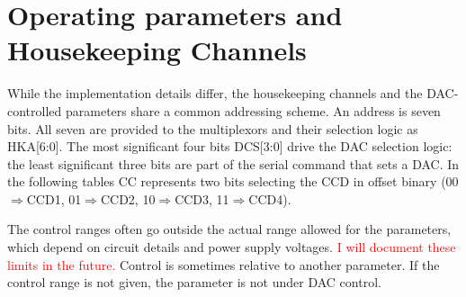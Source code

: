 \documentclass[12pt]{article}
\let\oldsection\section
\renewcommand{\section}{\FloatBarrier\oldsection}
\begin{document}
\normalsize

\section{Operating parameters and Housekeeping Channels}

While the implementation details differ, the housekeeping channels and the DAC-controlled parameters share a common addressing scheme. An address is seven bits. All seven are provided to the multiplexors and their selection logic as HKA[6:0]. The most significant four bits DCS[3:0] drive the DAC selection logic: the least significant three bits are part of the serial command that sets a DAC. In the following tables CC represents two bits selecting the CCD in offset binary (00$\Rightarrow$CCD1, 01$\Rightarrow$CCD2, 10$\Rightarrow$CCD3, 11$\Rightarrow$CCD4).

The control ranges often go outside the actual range allowed for the parameters, which depend on circuit details and power supply voltages. \textcolor{red}{I will document these limits in the future.} Control is sometimes relative to another parameter. If the control range is not given, the parameter is not under DAC control.
\end{document}

